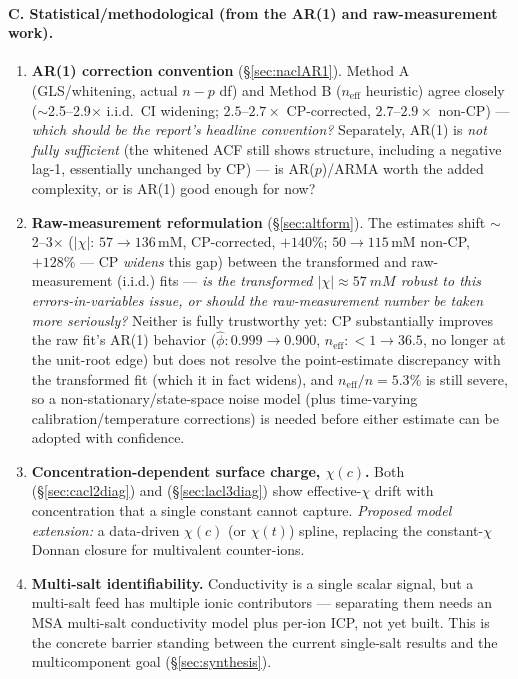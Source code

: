 \documentclass[11pt]{article}
\begin{document}
\paragraph{C. Statistical/methodological (from the AR(1) and raw-measurement work).}
\begin{enumerate}[itemsep=3pt,leftmargin=2.2em,start=13]
  \item \textbf{AR(1) correction convention} (\S\ref{sec:naclAR1}). Method A
        (GLS/whitening, actual $n-p$ df) and Method B ($n_{\mathrm{eff}}$
        heuristic) agree closely ($\sim$2.5--2.9$\times$ i.i.d.\ CI
        widening; $2.5$--$2.7\times$ CP-corrected, $2.7$--$2.9\times$ non-CP) ---
        \emph{which should be the report's headline
        convention?} Separately, AR(1) is \emph{not fully sufficient} (the
        whitened ACF still shows structure, including a negative lag-1,
        essentially unchanged by CP) ---
        is AR($p$)/ARMA worth the added complexity, or is AR(1) good enough
        for now?
  \item \textbf{Raw-measurement reformulation} (\S\ref{sec:altform}). The
        estimates shift $\sim$2--3$\times$ ($|\chi|$: $57\to136$\,mM,
        CP-corrected, $+140\%$; $50\to115$\,mM non-CP, $+128\%$ --- CP
        \emph{widens} this gap) between
        the transformed and raw-measurement (i.i.d.) fits --- \emph{is the
        transformed $|\chi|\approx\SI{57}{mM}$ robust to this
        errors-in-variables issue, or should the raw-measurement number be
        taken more seriously?} Neither is fully trustworthy yet: CP
        substantially improves the raw fit's AR(1) behavior
        ($\hat\phi:0.999\to0.900$, $n_{\mathrm{eff}}:<1\to36.5$, no longer at
        the unit-root edge) but does not resolve the point-estimate
        discrepancy with the transformed fit (which it in fact widens), and
        $n_{\mathrm{eff}}/n=5.3\%$ is still severe, so a
        non-stationary/state-space noise model (plus time-varying
        calibration/temperature corrections) is needed before either
        estimate can be adopted with confidence.
  \item \textbf{Concentration-dependent surface charge, $\chi(c)$.} Both
         (\S\ref{sec:cacl2diag}) and  (\S\ref{sec:lacl3diag})
        show effective-$\chi$ drift with concentration that a single constant
        cannot capture. \emph{Proposed model extension:} a data-driven
        $\chi(c)$ (or $\chi(t)$) spline, replacing the constant-$\chi$ Donnan
        closure for multivalent counter-ions.
  \item \textbf{Multi-salt identifiability.} Conductivity is a single scalar
        signal, but a multi-salt feed has multiple ionic contributors ---
        separating them needs an MSA multi-salt conductivity model plus
        per-ion ICP, not yet built. This is the concrete barrier standing
        between the current single-salt results and the multicomponent goal
        (\S\ref{sec:synthesis}).
\end{enumerate}
\end{document}
